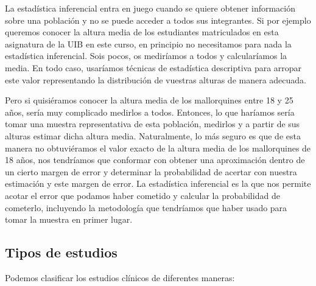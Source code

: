\documentclass[
  spanish,
  letterpaper,
  DIV=11,
  numbers=noendperiod]{scrreprt}
\begin{document}
La estadística inferencial entra en juego cuando se quiere obtener
información sobre una población y no se puede acceder a todos sus
integrantes. Si por ejemplo queremos conocer la altura media de los
estudiantes matriculados en esta asignatura de la UIB en este curso, en
principio no necesitamos para nada la estadística inferencial. Sois
pocos, os mediríamos a todos y calcularíamos la media. En todo caso,
usaríamos técnicas de estadística descriptiva para arropar este valor
representando la distribución de vuestras alturas de manera adecuada.

Pero si quisiéramos conocer la altura media de los mallorquines entre 18
y 25 años, sería muy complicado medirlos a todos. Entonces, lo que
haríamos sería tomar una muestra representativa de esta población,
medirlos y a partir de sus alturas estimar dicha altura media.
Naturalmente, lo más seguro es que de esta manera no obtuviéramos el
valor exacto de la altura media de los mallorquines de 18 años, nos
tendríamos que conformar con obtener una aproximación dentro de un
cierto margen de error y determinar la probabilidad de acertar con
nuestra estimación y este margen de error. La estadística inferencial es
la que nos permite acotar el error que podamos haber cometido y calcular
la probabilidad de cometerlo, incluyendo la metodología que tendríamos
que haber usado para tomar la muestra en primer lugar.

\subsection{Tipos de estudios}\label{tipos-de-estudios}

Podemos clasificar los estudios clínicos de diferentes maneras:
\end{document}
